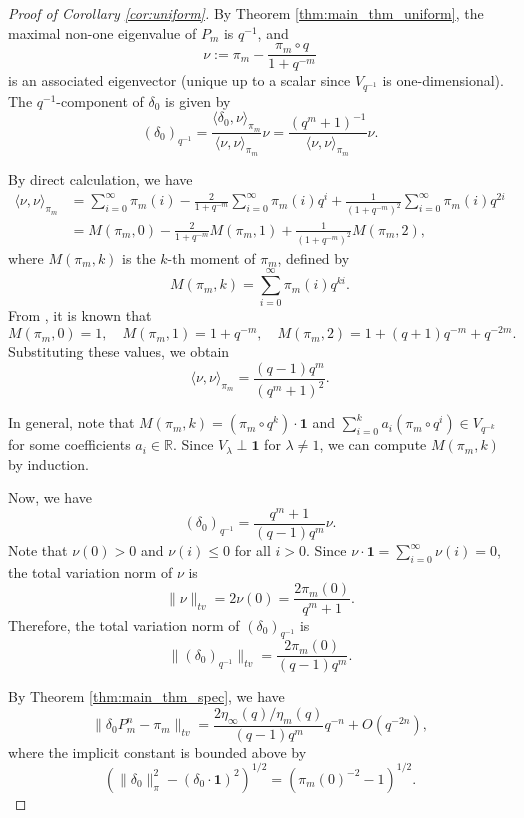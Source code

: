 \documentclass[a4]{amsart}
\theoremstyle{remark} \newtheorem{remark}[theorem]{Remark}
\begin{document}
\begin{proof}[Proof of Corollary \ref{cor:uniform}]
By Theorem \ref{thm:main_thm_uniform}, the maximal non-one eigenvalue of $P_m$ is $q^{-1}$, and
\[
\nu := \pi_m - \frac{\pi_m \circ q}{1 + q^{-m}}
\]
is an associated eigenvector (unique up to a scalar since $V_{q^{-1}}$ is one-dimensional). 
The $q^{-1}$-component of $\delta_0$ is given by
\[
(\delta_0)_{q^{-1}} = \frac{\langle \delta_0, \nu \rangle_{\pi_m}}{\langle \nu, \nu \rangle_{\pi_m}} \nu = \frac{(q^m + 1)^{-1}}{\langle \nu, \nu \rangle_{\pi_m}} \nu.
\]

By direct calculation, we have
\[
\begin{split}
\langle \nu, \nu \rangle_{\pi_m} &= \sum_{i=0}^{\infty} \pi_m(i) - \frac{2}{1 + q^{-m}} \sum_{i=0}^{\infty} \pi_m(i) q^i + \frac{1}{(1 + q^{-m})^2} \sum_{i=0}^{\infty} \pi_m(i) q^{2i} \\
&= M(\pi_m, 0) - \frac{2}{1 + q^{-m}} M(\pi_m, 1) + \frac{1}{(1 + q^{-m})^2} M(\pi_m, 2),
\end{split}
\]
where $M(\pi_m, k)$ is the $k$-th moment of $\pi_m$, defined by
\[
M(\pi_m, k) = \sum_{i=0}^{\infty} \pi_m(i) q^{k i}.
\]
From \cite[Example 6.6]{cohen1984Heuristics}, it is known that
\[
M(\pi_m, 0) = 1, \quad M(\pi_m, 1) = 1 + q^{-m}, \quad M(\pi_m, 2) = 1 + (q + 1) q^{-m} + q^{-2m}.
\]
Substituting these values, we obtain
\[
\langle \nu, \nu \rangle_{\pi_m} = \frac{(q - 1) q^m}{(q^m + 1)^2}.
\]

In general, note that $M(\pi_m, k) = (\pi_m \circ q^k) \cdot \mathbf{1}$ and $\sum_{i=0}^{k} a_i (\pi_m \circ q^i) \in V_{q^{-k}}$ for some coefficients $a_i \in \mathbb{R}$. Since $V_\lambda \perp \mathbf{1}$ for $\lambda \neq 1$, we can compute $M(\pi_m, k)$ by induction.

Now, we have
\[
(\delta_0)_{q^{-1}} = \frac{q^m + 1}{(q - 1) q^m} \nu.
\]
Note that $\nu(0) > 0$ and $\nu(i) \leq 0$ for all $i > 0$. 
Since $\nu \cdot\mathbf{1}=\sum_{i=0}^{\infty} \nu(i) = 0$, the total variation norm of $\nu$ is
\[
\|\nu\|_{tv} =2\nu(0)= \frac{2 \pi_m(0)}{q^m + 1}.
\]
Therefore, the total variation norm of $(\delta_0)_{q^{-1}}$ is
\[
\|(\delta_0)_{q^{-1}}\|_{tv} = \frac{2 \pi_m(0)}{(q - 1) q^m}.
\]

By Theorem \ref{thm:main_thm_spec}, we have
\[
\|\delta_0 P_m^n - \pi_m\|_{tv} = \frac{2 \eta_\infty(q) / \eta_m(q)}{(q - 1) q^m} q^{-n} + O(q^{-2n}),
\]
where the implicit constant is bounded above by
\[
\left(\|\delta_0\|_\pi^2 - (\delta_0 \cdot \mathbf{1})^2\right)^{1/2} = \left(\pi_m(0)^{-2} - 1\right)^{1/2}.
\]
\end{proof}
\end{document}
